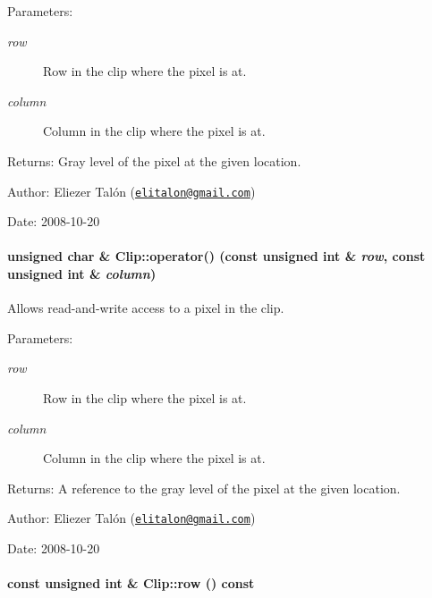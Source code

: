 \begin{Desc}
\item[Parameters:]
\begin{description}
\item[{\em row}]Row in the clip where the pixel is at. \item[{\em column}]Column in the clip where the pixel is at.\end{description}
\end{Desc}
\begin{Desc}
\item[Returns:]Gray level of the pixel at the given location.\end{Desc}
\begin{Desc}
\item[Author:]Eliezer Talón (\href{mailto:elitalon@gmail.com}{\tt elitalon@gmail.com}) \end{Desc}
\begin{Desc}
\item[Date:]2008-10-20 \end{Desc}
\hypertarget{class_clip_0f80c2b0f0f177fe9c780c93596f77be}{
\paragraph[{operator()}]{\setlength{\rightskip}{0pt plus 5cm}unsigned char \& Clip::operator() (const unsigned int \& {\em row}, \/  const unsigned int \& {\em column})}\hfill}
\label{class_clip_0f80c2b0f0f177fe9c780c93596f77be}


Allows read-and-write access to a pixel in the clip. 

\begin{Desc}
\item[Parameters:]
\begin{description}
\item[{\em row}]Row in the clip where the pixel is at. \item[{\em column}]Column in the clip where the pixel is at.\end{description}
\end{Desc}
\begin{Desc}
\item[Returns:]A reference to the gray level of the pixel at the given location.\end{Desc}
\begin{Desc}
\item[Author:]Eliezer Talón (\href{mailto:elitalon@gmail.com}{\tt elitalon@gmail.com}) \end{Desc}
\begin{Desc}
\item[Date:]2008-10-20 \end{Desc}
\hypertarget{class_clip_1a1d1fd626d1325f0f2b9184de4c89b8}{
\paragraph[{row}]{\setlength{\rightskip}{0pt plus 5cm}const unsigned int \& Clip::row () const}\hfill}
\label{class_clip_1a1d1fd626d1325f0f2b9184de4c89b8}


